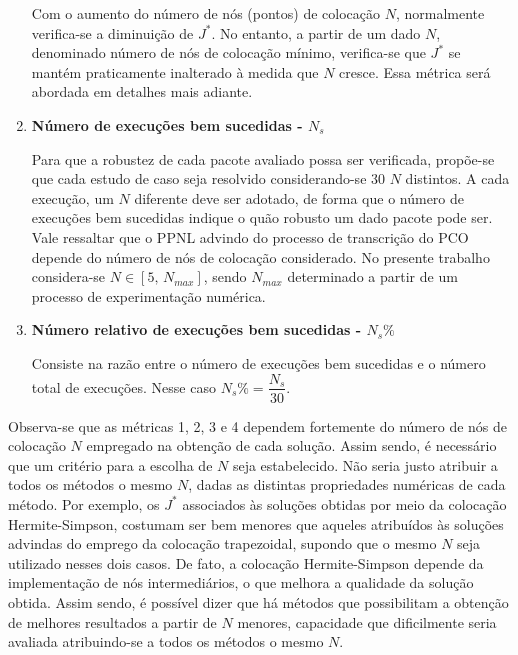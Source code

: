 \begin{enumerate}
	Com o aumento do número de nós (pontos) de colocação $ N $, normalmente verifica-se a diminuição de $ J^* $. No entanto, a partir de um dado $ N $, denominado número de nós de colocação mínimo, verifica-se que  $ J^* $ se mantém praticamente inalterado à medida que $ N $ cresce. Essa métrica será abordada em detalhes mais adiante.
	
	\item \textbf{Número de execuções bem sucedidas - \boldmath$ N_s $}
	
	Para que a robustez de cada pacote avaliado possa ser verificada, propõe-se que cada estudo de caso seja resolvido considerando-se 30 $ N $ distintos. A cada execução, um $ N $ diferente deve ser adotado, de forma que o número de execuções bem sucedidas indique o quão robusto um dado pacote pode ser. Vale ressaltar que o PPNL advindo do processo de transcrição do PCO depende do número de nós de colocação considerado. No presente trabalho considera-se $ N \in [5, \, N_{max}] $, sendo $ N_{max} $ determinado a partir de um processo de experimentação numérica. 
	
	\item \textbf{Número relativo de execuções bem sucedidas - \boldmath$ N_s\% $}
	
	Consiste na razão entre o número de execuções bem sucedidas e o número total de execuções. Nesse caso $ N_s\% = \dfrac{N_s}{30} $.
\end{enumerate}


Observa-se que as métricas 1, 2, 3 e 4 dependem fortemente do número de nós de colocação $ N $ empregado na obtenção de cada solução. Assim sendo, é necessário que um critério para a escolha de $ N $ seja estabelecido. Não seria justo atribuir a todos os métodos o mesmo $ N $, dadas as distintas propriedades numéricas de cada método. Por exemplo, os $ J^* $ associados às soluções obtidas por meio da colocação Hermite-Simpson, costumam ser bem menores que aqueles atribuídos às soluções advindas do emprego da colocação trapezoidal, supondo que o mesmo $ N $ seja utilizado nesses dois casos. De fato, a colocação Hermite-Simpson depende da implementação de nós intermediários, o que melhora a qualidade da solução obtida. Assim sendo, é possível dizer que há métodos que possibilitam a obtenção de melhores resultados a partir de $ N $ menores, capacidade que dificilmente seria avaliada atribuindo-se a todos os métodos o mesmo $ N $. 

